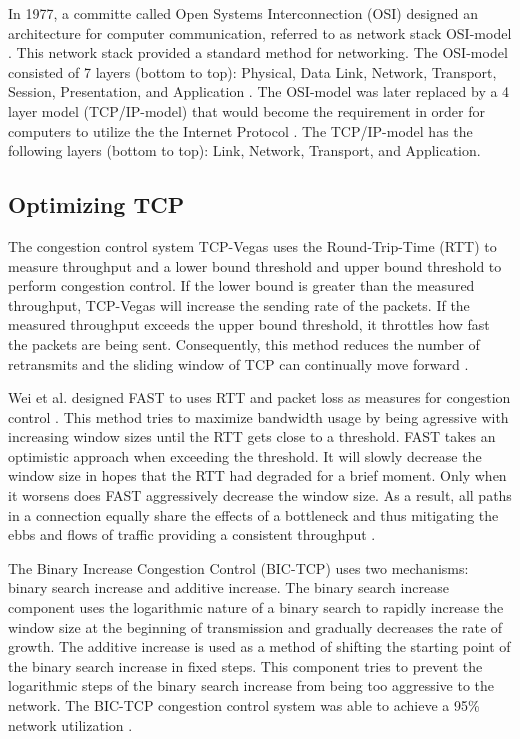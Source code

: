In 1977, a committe called Open Systems Interconnection (OSI) designed an architecture for computer communication, referred to as network stack OSI-model \cite{zimmermann1980osi}. This network stack provided a standard method for networking. The OSI-model consisted of 7 layers (bottom to top): Physical, Data Link, Network, Transport, Session, Presentation, and Application \cite{zimmermann1980osi}. The OSI-model was later replaced by a 4 layer model (TCP/IP-model) that would become the requirement in order for computers to utilize the the Internet Protocol \cite{braden1989requirements}. The TCP/IP-model has the following layers (bottom to top): Link, Network, Transport, and Application.

\subsection{Optimizing TCP}

The congestion control system TCP-Vegas \cite{brakmo1995tcp} uses the Round-Trip-Time (RTT) to measure throughput and a lower bound threshold and upper bound threshold to perform congestion control. If the lower bound is greater than the measured throughput, TCP-Vegas will increase the sending rate of the packets. If the measured throughput exceeds the upper bound threshold, it throttles how fast the packets are being sent. Consequently, this method reduces the number of retransmits and the sliding window of TCP can continually move forward \cite{brakmo1995tcp}.

Wei et al. designed FAST to uses RTT and packet loss as measures for congestion control \cite{wei2006fast}. This method tries to maximize bandwidth usage by being agressive with increasing window sizes until the RTT gets close to a threshold. FAST takes an optimistic approach when exceeding the threshold. It will slowly decrease the window size in hopes that the RTT had degraded for a brief moment. Only when it worsens does FAST aggressively decrease the window size. As a result, all paths in a connection equally share the effects of a bottleneck and thus mitigating the ebbs and flows of traffic providing a consistent throughput \cite{wei2006fast}.

The Binary Increase Congestion Control (BIC-TCP) \cite{xu2004binary} uses two mechanisms: binary search increase and additive increase. The binary search increase component uses the logarithmic nature of a binary search to rapidly increase the window size at the beginning of transmission and gradually decreases the rate of growth. The additive increase is used as a method of shifting the starting point of the binary search increase in fixed steps. This component tries to prevent the logarithmic steps of the binary search increase from being too aggressive to the network. The BIC-TCP congestion control system was able to achieve a 95\% network utilization \cite{xu2004binary}.

